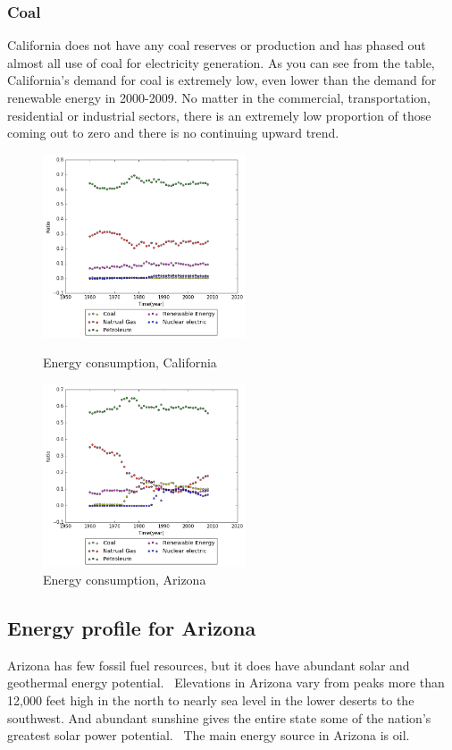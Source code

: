\documentclass{mcmthesis}
\begin{document}
\subsubsection{Coal}
  California does not have any coal reserves or production and has phased out almost all use of coal for electricity generation.
  As you can see from the table, California's demand for coal is extremely low, even lower than the demand for renewable energy in 2000-2009.
  No matter in the commercial, transportation, residential or industrial sectors, there is an extremely low proportion of those coming out to zero and there is no continuing upward trend.
  \begin{figure}[htbp]
  \centering
  \begin{minipage}[t]{0.48\textwidth}
  \centering
  \includegraphics[width=6cm]{energyprofile_ca.png}
  \caption{Energy consumption, California}
  \end{minipage}
  \begin{minipage}[t]{0.48\textwidth}
  \centering
  \includegraphics[width=6cm]{energyprofile_az.png}
  \caption{Energy consumption, Arizona}
  \end{minipage}
  \end{figure}
\subsection{Energy profile for Arizona}
Arizona has few fossil fuel resources, but it does have abundant solar and geothermal energy potential. 
Elevations in Arizona vary from peaks more than 12,000 feet high in the north to nearly sea level in the lower deserts to the southwest.
And abundant sunshine gives the entire state some of the nation’s greatest solar power potential. 
The main energy source in Arizona is oil.
\end{document}
